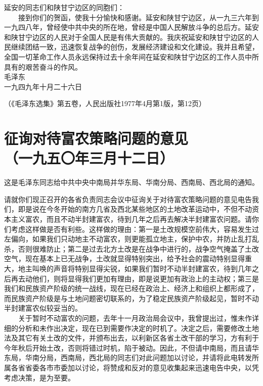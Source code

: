 \documentclass[cn,11pt,chinese]{elegantbook}
\def\myformat#1{\hfil\hfil #1}
\begin{document}
延安的同志们和陕甘宁边区的同胞们：\\
　　接到你们的贺函，使我十分愉快和感谢。延安和陕甘宁边区，从一九三六年到一九四八年，曾经使中共中央的所在地，曾经是中国人民解放斗争的总后方。延安和陕甘宁边区的人民对于全国人民是有伟大贡献的。我庆祝延安和陕甘宁边区的人民继续团结一致，迅速恢复战争的创伤，发展经济建设和文化建设。我并且希望，全国一切革命工作人员永远保持过去十余年间在延安和陕甘宁边区的工作人员中所具有的艰苦奋斗的作风。\\
毛泽东\\
一九四九年十月二十六日　\\
\begin{flushright}（《毛泽东选集》第五卷，人民出版社1977年4月第1版，第12页）\end{flushright}
\newpage\section*{\myformat{征询对待富农策略问题的意见}\\\myformat{（一九五〇年三月十二日）}}
\begin{introduction}\item  这是毛泽东同志给中共中央中南局并华东局、华南分局、西南局、西北局的通知。\end{introduction}
请就你们现正召开的各省负责同志会议中征询关于对待富农策略问题的意见电告我们，即是说在今冬开始的南方几省及西北某些地区的土地改革运动中，不但不动资本主义富农，而且不动半封建富农，待到几年之后再去解决半封建富农问题。请你们考虑这样做是否有利些。这样做的理由：第一是土改规模空前伟大，容易发生过左偏向，如果我们只动地主不动富农，则更能孤立地主，保护中农，并防止乱打乱杀，否则很难防止；第二是过去北方土改是在战争中进行的，战争空气掩盖了土改空气，现在基本上已无战争，土改就显得特别突出，给予社会的震动特别显得重大，地主叫唤的声音将特别显得尖锐，如果我们暂时不动半封建富农，待到几年之后再去动他们，则将显得我们更加有理由，即是说更加有政治上的主动权；第三是我们和民族资产阶级的统一战线，现在已经在政治上、经济上和组织上都形成了，而民族资产阶级是与土地问题密切联系的，为了稳定民族资产阶级起见，暂时不动半封建富农似较妥当的。\\
　　关于暂时不动富农的问题，去年十一月政治局会议中，我曾提出过，惟未作详细的分析和未作出决定，现在已到需要作决定的时机了。决定之后，需要修改土地法及其它有关土改的文件，并颁布出去，以利新区各省土改干部的学习，方有利于今年秋后开始土改，否则将错过时机，陷于被动。因此，不但请中南局，而且请华东局，华南分局，西南局，西北局的同志们对此问题加以讨论，并请将此电转发所属各省省委各市市委加以讨论，将赞成和反对的意见收集起来迅速电告中央，以凭考虑决策，是为至要。\\
\end{document}
